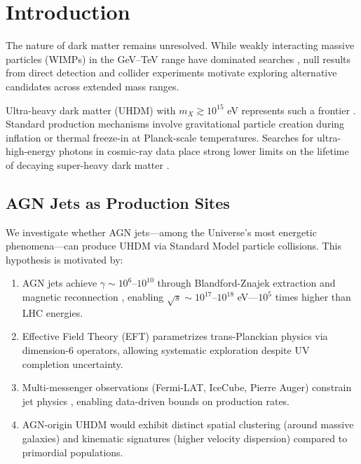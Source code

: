 \documentclass[twocolumn,superscriptaddress,prd,nofootinbib]{revtex4-2}
\begin{document}
\section{Introduction}
\label{sec:intro}

The nature of dark matter remains unresolved. While weakly interacting massive particles (WIMPs) in the GeV--TeV range have dominated searches \citep{Jungman1996,Bertone2005}, null results from direct detection \citep{LZ2024} and collider experiments \citep{ATLAS2023} motivate exploring alternative candidates across extended mass ranges.

Ultra-heavy dark matter (UHDM) with $m_X \gtrsim 10^{15}$ eV represents such a frontier \citep{Chung1998a,Kolb2017}. Standard production mechanisms involve gravitational particle creation during inflation \citep{Chung1998a} or thermal freeze-in at Planck-scale temperatures. Searches for ultra-high-energy photons in cosmic-ray data place strong lower limits on the lifetime of decaying super-heavy dark matter \citep{Alcantara2019}.

\subsection{AGN Jets as Production Sites}

We investigate whether AGN jets---among the Universe's most energetic phenomena---can produce UHDM via Standard Model particle collisions. This hypothesis is motivated by:

\begin{enumerate}
\item AGN jets achieve $\gamma \sim 10^6$--$10^{10}$ through Blandford-Znajek extraction \citep{BlandfordZnajek1977} and magnetic reconnection \citep{Tchekhovskoy2011}, enabling $\sqrt{s} \sim 10^{17}$--$10^{18}$ eV---$10^5$ times higher than LHC energies.

\item Effective Field Theory (EFT) \citep{Grzadkowski2010} parametrizes trans-Planckian physics via dimension-6 operators, allowing systematic exploration despite UV completion uncertainty.

\item Multi-messenger observations (Fermi-LAT, IceCube, Pierre Auger) constrain jet physics \citep{Ajello2017,IceCube2024,Auger2020}, enabling data-driven bounds on production rates.

\item AGN-origin UHDM would exhibit distinct spatial clustering (around massive galaxies) and kinematic signatures (higher velocity dispersion) compared to primordial populations.
\end{enumerate}
\end{document}
